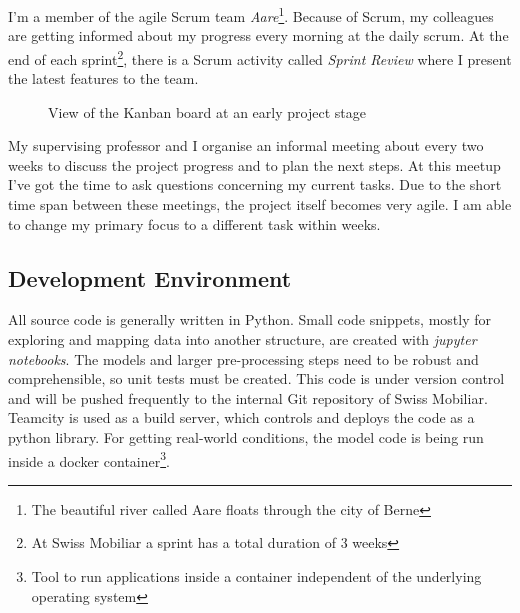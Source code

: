 I'm a member of the agile Scrum team \emph{Aare}\footnote{The beautiful river called Aare floats through the city of Berne}. Because of
Scrum, my colleagues are getting informed about my progress every morning at the daily scrum. At the end of each sprint\footnote{At
Swiss Mobiliar a sprint has a total duration of 3 weeks}, there is a Scrum activity called \emph{Sprint Review} where I present the
latest features to the team.

\begin{figure}[!ht]
\centering
{}
\caption{View of the Kanban board at an early project stage}
\label{fig:kanban}
\end{figure}

My supervising professor and I organise an informal meeting about every two weeks to discuss the project progress and to plan the
next steps. At this meetup I've got the time to ask questions concerning my current tasks. Due to the short time span between these
meetings, the project itself becomes very agile. I am able to change my primary focus to a different task within weeks.

\subsection{Development Environment}

All source code is generally written in Python. Small code snippets, mostly for exploring and mapping data into another structure,
are created with \emph{jupyter notebooks}. The models and larger pre-processing steps need to be robust and comprehensible, so
unit tests must be created. This code is under version control and will be pushed frequently to the internal Git repository of
Swiss Mobiliar. Teamcity is used as a build server, which controls and deploys the code as a python library. For getting real-world
conditions, the model code is being run inside a docker container\footnote{Tool to run applications inside a container independent
of the underlying operating system}.
